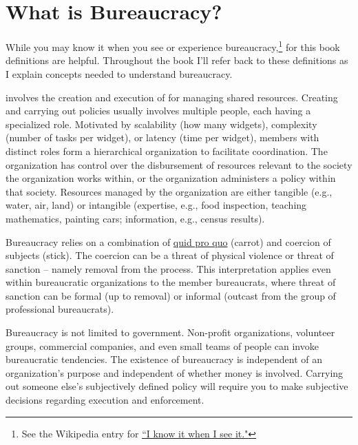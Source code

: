 \section{What is Bureaucracy?\label{sec:define-bureaucracy}}

While you may know it when you see or experience bureaucracy,\footnote{See the Wikipedia entry for \href{https://en.wikipedia.org/wiki/I_know_it_when_I_see_it}{``I know it when I see it."}} 
for this book definitions are helpful. Throughout the book I'll refer back to these definitions as I explain concepts needed to understand bureaucracy.

\iftoggle{glossaryinmargin}{\marginpar{[Glossary]}}{ }
\iftoggle{glossarysubstitutionworks}{\Gls{bureaucracy}}{Bureaucracy}
involves the creation and execution of 
\iftoggle{glossarysubstitutionworks}{\glspl{policy}}{policies} for managing shared resources. 
Creating and carrying out policies usually involves multiple people, each having a specialized role. Motivated by scalability (how many widgets), complexity (number of tasks per widget), or latency (time per widget), members with distinct roles form a hierarchical organization to facilitate coordination. The organization has control over the disbursement of resources relevant to the society the organization works within, or the organization administers a policy within that society. Resources managed by the organization are either tangible (e.g., water, air, land) or intangible (expertise, e.g., food inspection, teaching mathematics, painting cars; information, e.g., census results).  

Bureaucracy relies on a combination of \href{https://en.wikipedia.org/wiki/Quid_pro_quo}{quid pro quo}
(carrot) and coercion of subjects (stick). The coercion can be a threat of physical violence or threat of sanction -- namely removal from the process. This interpretation applies even within bureaucratic organizations to the member bureaucrats, where threat of sanction can be formal (up to removal) or informal (outcast from the group of professional bureaucrats).

Bureaucracy is not limited to government. Non-profit organizations, volunteer groups, commercial companies, and even small teams of people can invoke bureaucratic tendencies. The existence of bureaucracy is independent of an organization's purpose and independent of whether money is involved. Carrying out someone else's subjectively defined policy will require you to make subjective decisions regarding execution and enforcement. 

